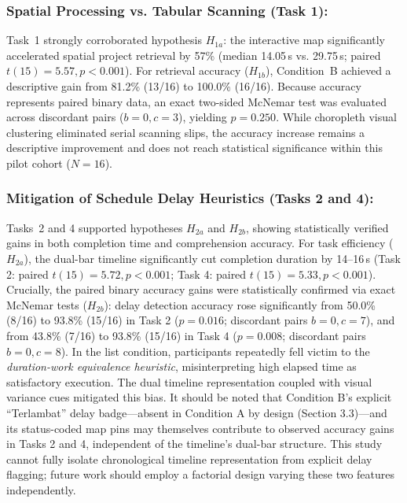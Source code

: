 \documentclass[runningheads]{llncs}
\newcommand{\hl}[1]{#1}
\begin{document}
\subsubsection{Spatial Processing vs. Tabular Scanning (Task 1):}
Task~1 strongly corroborated hypothesis $H_{1a}$: the interactive map significantly accelerated spatial project retrieval by 57\% (median 14.05\,s vs. 29.75\,s; paired $t(15) = 5.57, p < 0.001$). For retrieval accuracy ($H_{1b}$), Condition~B achieved a descriptive gain from 81.2\% (13/16) to 100.0\% (16/16). Because accuracy represents paired binary data, an exact two-sided McNemar test was evaluated across discordant pairs ($b = 0, c = 3$), yielding $p = 0.250$. While choropleth visual clustering eliminated serial scanning slips, the accuracy increase remains a descriptive improvement and does not reach statistical significance within this pilot cohort ($N = 16$).

\subsubsection{Mitigation of Schedule Delay Heuristics (Tasks 2 and 4):}
Tasks~2 and 4 supported hypotheses $H_{2a}$ and $H_{2b}$, showing statistically verified gains in both completion time and comprehension accuracy. For task efficiency ($H_{2a}$), the dual-bar timeline significantly cut completion duration by 14--16\,s (Task 2: paired $t(15) = 5.72, p < 0.001$; Task 4: paired $t(15) = 5.33, p < 0.001$). Crucially, the paired binary accuracy gains were statistically confirmed via exact McNemar tests ($H_{2b}$): delay detection accuracy rose significantly from 50.0\% (8/16) to 93.8\% (15/16) in Task 2 ($p = 0.016$; discordant pairs $b = 0, c = 7$), and from 43.8\% (7/16) to 93.8\% (15/16) in Task 4 ($p = 0.008$; discordant pairs $b = 0, c = 8$). In the list condition, participants repeatedly fell victim to the \emph{duration-work equivalence heuristic}, misinterpreting high elapsed time as satisfactory execution. The dual timeline representation coupled with visual variance cues mitigated this bias. \hl{It should be noted that Condition B's explicit ``Terlambat'' delay badge---absent in Condition A by design (Section 3.3)---and its status-coded map pins may themselves contribute to observed accuracy gains in Tasks 2 and 4, independent of the timeline's dual-bar structure. This study cannot fully isolate chronological timeline representation from explicit delay flagging; future work should employ a factorial design varying these two features independently.}
\end{document}
